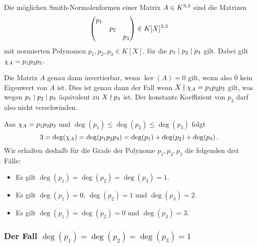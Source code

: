 \section{}





\subsection{}

Die möglichen Smith-Normalenformen einer Matrix $A \in \matrices{3}{K}$ sind die Matrizen
\[
      \begin{pmatrix}
        p_1 &     &     \\
            & p_2 &     \\
            &     & p_3
      \end{pmatrix}
  \in \matrices{3}{K[X]}
\]
mit normierten Polynomen $p_1, p_2, p_3 \in K[X]$, für die $p_1 \divides p_2 \divides p_3$ gilt.
Dabei gilt $\charpol{A} = p_1 p_2 p_3$.

Die Matrix $A$ genau dann invertierbar, wenn $\ker(A) = 0$ gilt, wenn also $0$ kein Eigenwert von $A$ ist.
Dies ist genau dann der Fall wenn $X \notdivides \charpol{A} = p_1 p_2 p_3$ gilt, was wegen $p_1 \divides p_2 \divides p_3$ äquivalent zu $X \notdivides p_3$ ist.
Der konstante Koeffizient von $p_3$ darf also nicht verschwinden.

Aus $\charpol{A} = p_1 p_2 p_3$ und $\deg(p_1) \leq \deg(p_2) \leq \deg(p_3)$ folgt
\[
    3
  = \deg(\charpol{A})
  = \deg(p_1 p_2 p_3)
  = \deg(p_1) + \deg(p_2) + \deg(p_3) \,.
\]
Wir erhalten deshalb für die Grade der Polynome $p_1, p_2, p_3$ die folgenden drei Fälle:
\begin{itemize}
  \item
    Es gilt $\deg(p_1) = \deg(p_2) = \deg(p_3) = 1$.
  \item
    Es gilt $\deg(p_1) = 0$, $\deg(p_2) = 1$ und $\deg(p_3) = 2$.
  \item
    Es gilt $\deg(p_1) = \deg(p_2) = 0$ und $\deg(p_3) = 3$.
\end{itemize}



\subsubsection*{Der Fall $\deg(p_1) = \deg(p_2) = \deg(p_3) = 1$}


